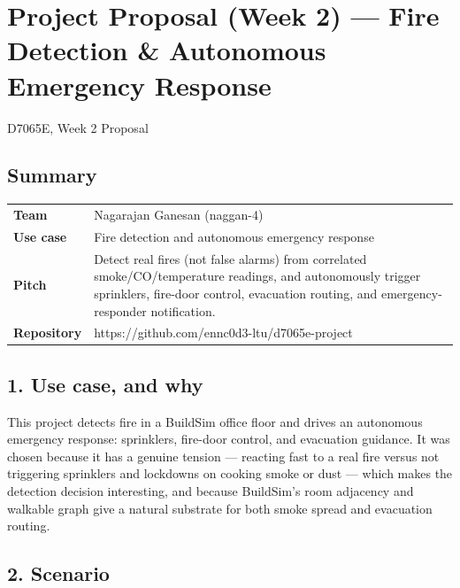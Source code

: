 \documentclass[
  10pt,
]{article}
\author{}
\date{}
\begin{document}
\section{Project Proposal (Week 2) --- Fire Detection \& Autonomous
Emergency
Response}\label{project-proposal-week-2-fire-detection-autonomous-emergency-response}

D7065E, Week 2 Proposal

\subsection{Summary}\label{summary}

\begin{longtable}[]{@{}
  >{\raggedright\arraybackslash}p{}
  >{\raggedright\arraybackslash}p{}@{}}
\toprule\noalign{}
\endhead
\bottomrule\noalign{}
\endlastfoot
\textbf{Team} & Nagarajan Ganesan (naggan-4) \\
\textbf{Use case} & Fire detection and autonomous emergency response \\
\textbf{Pitch} & Detect real fires (not false alarms) from correlated
smoke/CO/temperature readings, and autonomously trigger sprinklers,
fire-door control, evacuation routing, and emergency-responder
notification. \\
\textbf{Repository} & https://github.com/ennc0d3-ltu/d7065e-project \\
\end{longtable}

\subsection{1. Use case, and why}\label{use-case-and-why}

This project detects fire in a BuildSim office floor and drives an
autonomous emergency response: sprinklers, fire-door control, and
evacuation guidance. It was chosen because it has a genuine tension ---
reacting fast to a real fire versus not triggering sprinklers and
lockdowns on cooking smoke or dust --- which makes the detection
decision interesting, and because BuildSim's room adjacency and walkable
graph give a natural substrate for both smoke spread and evacuation
routing.

\subsection{2. Scenario}\label{scenario}
\end{document}
